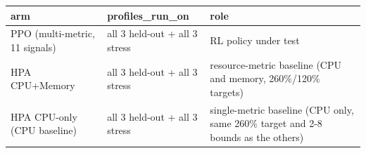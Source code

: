 \begin{tabular}{lll}
\hline
arm & profiles\_run\_on & role \\
\hline
PPO (multi-metric, 11 signals) & all 3 held-out + all 3 stress & RL policy under test \\
HPA CPU+Memory & all 3 held-out + all 3 stress & resource-metric baseline (CPU and memory, 260\%/120\% targets) \\
HPA CPU-only (CPU baseline) & all 3 held-out + all 3 stress & single-metric baseline (CPU only, same 260\% target and 2-8 bounds as the others) \\
\hline
\end{tabular}
